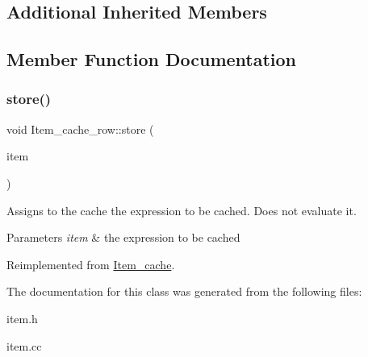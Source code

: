 \subsection*{Additional Inherited Members}


\subsection{Member Function Documentation}
\mbox{\label{classItem__cache__row_aa782d678a13a494afe3882ced878ee7c}} 
\subsubsection{\texorpdfstring{store()}{store()}}
{\footnotesize\ttfamily void Item\+\_\+cache\+\_\+row\+::store (\begin{DoxyParamCaption}\item[{\mbox{\hyperlink{classItem}{Item}} $\ast$}]{item }\end{DoxyParamCaption})\hspace{0.3cm}{\ttfamily [virtual]}}

Assigns to the cache the expression to be cached. Does not evaluate it. 
\begin{DoxyParams}{Parameters}
{\em item} & the expression to be cached \\
\hline
\end{DoxyParams}


Reimplemented from \mbox{\hyperlink{classItem__cache_a89d0134e0a71238cb6fa7a32a23f88e7}{Item\+\_\+cache}}.



The documentation for this class was generated from the following files\+:\begin{DoxyCompactItemize}
\item 
item.\+h\item 
item.\+cc\end{DoxyCompactItemize}
